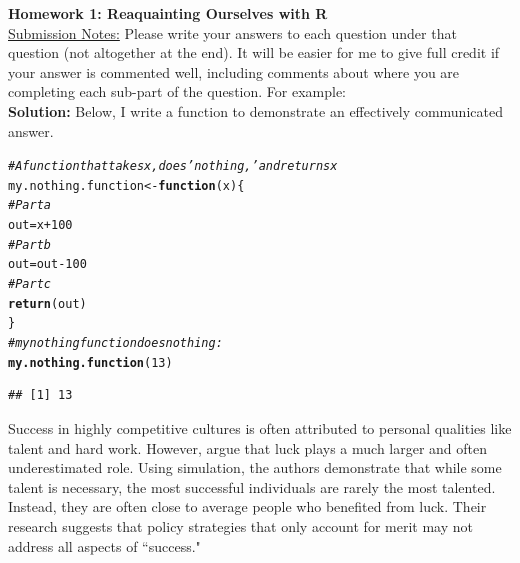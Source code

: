 \documentclass{article}\usepackage[]{graphicx}\usepackage[]{xcolor}
\makeatletter
\newcommand{\hlnum}[1]{\textcolor[rgb]{0.686,0.059,0.569}{#1}}%
\newcommand{\hlcom}[1]{\textcolor[rgb]{0.678,0.584,0.686}{\textit{#1}}}%
\newcommand{\hlopt}[1]{\textcolor[rgb]{0,0,0}{#1}}%
\newcommand{\hldef}[1]{\textcolor[rgb]{0.345,0.345,0.345}{#1}}%
\newcommand{\hlkwa}[1]{\textcolor[rgb]{0.161,0.373,0.58}{\textbf{#1}}}%
\newcommand{\hlkwb}[1]{\textcolor[rgb]{0.69,0.353,0.396}{#1}}%
\newcommand{\hlkwc}[1]{\textcolor[rgb]{0.333,0.667,0.333}{#1}}%
\newcommand{\hlkwd}[1]{\textcolor[rgb]{0.737,0.353,0.396}{\textbf{#1}}}%
\newenvironment{kframe}{%
 \def\at@end@of@kframe{}%
 \ifinner\ifhmode%
  \def\at@end@of@kframe{\end{minipage}}%
  \begin{minipage}{\columnwidth}%
 \fi\fi%
 \def\FrameCommand##1{\hskip\@totalleftmargin \hskip-\fboxsep
 \colorbox{shadecolor}{##1}\hskip-\fboxsep
     \hskip-\linewidth \hskip-\@totalleftmargin \hskip\columnwidth}%
 \MakeFramed {\advance\hsize-\width
   \@totalleftmargin\z@ \linewidth\hsize
   \@setminipage}}%
 {\par\unskip\endMakeFramed%
 \at@end@of@kframe}
\newenvironment{knitrout}{}{} %
\makeatother
\begin{document}
\noindent\textbf{Homework 1: Reaquainting Ourselves with R}\\
\noindent\makebox[\linewidth]{\rule{\textwidth}{0.4pt}}
\noindent\underline{Submission Notes:} Please write your answers to each question under that question (not altogether at the end). It will be easier for me to give full credit if your answer is commented well, including comments about where you are completing each sub-part of the question. For example:\\

\noindent\textbf{Solution:} Below, I write a function to demonstrate an effectively communicated answer.
\begin{knitrout}\scriptsize
{}\color{fgcolor}\begin{kframe}
\begin{alltt}
\hlcom{# A function that takes x, does 'nothing,' and returns x}
\hldef{my.nothing.function} \hlkwb{<-} \hlkwa{function}\hldef{(}\hlkwc{x}\hldef{)\{}
  \hlcom{# Part a}
  \hldef{out} \hlkwb{=} \hldef{x} \hlopt{+} \hlnum{100}
  \hlcom{# Part b}
  \hldef{out} \hlkwb{=} \hldef{out} \hlopt{-} \hlnum{100}
  \hlcom{# Part c}
  \hlkwd{return}\hldef{(out)}
\hldef{\}}
\hlcom{# my nothing function does nothing:}
\hlkwd{my.nothing.function}\hldef{(}\hlnum{13}\hldef{)}
\end{alltt}
\begin{verbatim}
## [1] 13
\end{verbatim}
\end{kframe}
\end{knitrout}


\noindent\makebox[\linewidth]{\rule{\textwidth}{0.4pt}}

Success in highly competitive cultures is often attributed to personal qualities like talent and hard work. However, \cite{Pluchino18} argue that luck plays a much larger and often underestimated role. Using simulation, the authors demonstrate that while some talent is necessary, the most successful individuals are rarely the most talented. Instead, they are often close to average people who benefited from luck. Their research suggests that policy strategies that only account for merit may not address all aspects of ``success."\\

\end{document}
